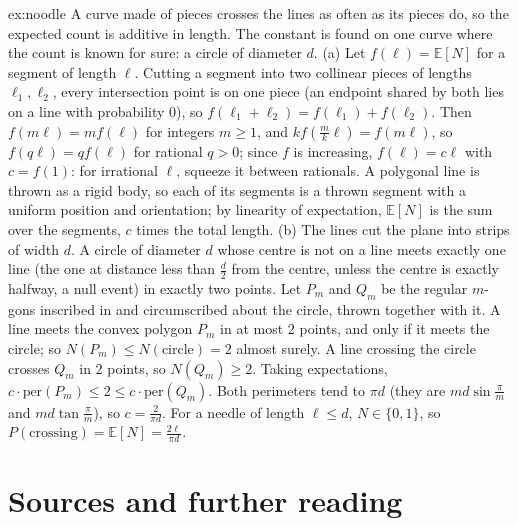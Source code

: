 \begin{solution}{ex:noodle}
\idea A curve made of pieces crosses the lines as often as its pieces do, so the expected count is additive in
length. The constant is found on one curve where the count is known for sure: a circle of diameter $d$.
\writeup (a) Let $f(\ell)=\mathbb E[N]$ for a segment of length $\ell$. Cutting a segment into two collinear pieces
of lengths $\ell_1,\ell_2$, every intersection point is on one piece (an endpoint shared by both lies on a line with
probability $0$), so $f(\ell_1+\ell_2)=f(\ell_1)+f(\ell_2)$. Then $f(m\ell)=mf(\ell)$ for integers $m\ge1$, and $kf(\frac mk\ell)=f(m\ell)$, so $f(q\ell)=qf(\ell)$ for rational $q>0$; since $f$ is increasing, $f(\ell)=c\ell$ with $c=f(1)$: for irrational $\ell$,
squeeze it between rationals. A polygonal line is thrown as a rigid body, so each of its segments is a thrown
segment with a uniform position and orientation; by linearity of expectation, $\mathbb E[N]$ is the sum over
the segments, $c$ times the total length.
(b) The lines cut the plane into strips of width $d$. A circle of diameter $d$ whose centre is not on a line
meets exactly one line (the one at distance less than $\frac d2$ from the centre, unless the centre is exactly
halfway, a null event) in exactly two points. Let $P_m$ and $Q_m$ be the regular $m$-gons inscribed in and
circumscribed about the circle, thrown together with it. A line meets the convex polygon $P_m$ in at most $2$
points, and only if it meets the circle; so $N(P_m)\le N(\text{circle})=2$ almost surely. A line crossing the
circle crosses $Q_m$ in $2$ points, so $N(Q_m)\ge2$. Taking expectations, $c\cdot\text{per}(P_m)\le2\le c\cdot\text{per}(Q_m)$.
Both perimeters tend to $\pi d$ (they are $md\sin\frac\pi m$ and $md\tan\frac\pi m$), so $c=\frac2{\pi d}$. For a needle of
length $\ell\le d$, $N\in\{0,1\}$, so $P(\text{crossing})=\mathbb E[N]=\frac{2\ell}{\pi d}$.
\end{solution}

\section*{Sources and further reading}

